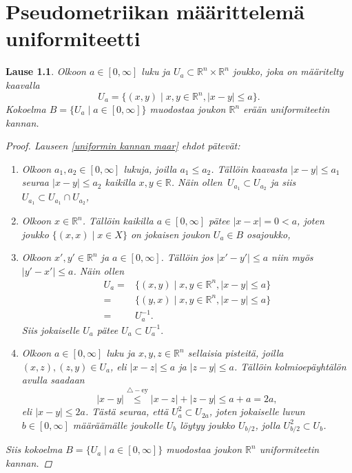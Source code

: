 \documentclass[12pt,a4paper,leqno]{report}
\newcommand{\R}{\mathbb{R}}
\theoremstyle{plain}
\newtheorem{lause}[equation]{Lause}
\theoremstyle{definition}
\theoremstyle{remark}
\begin{document}
\chapter{Pseudometriikan määrittelemä uniformiteetti}\label{luku_pseudo_uniformi}
\begin{lause}
Olkoon $a\in[0,\infty]$ luku ja $U_a\subset \R^n\times\R^n$ joukko, 
joka on määritelty kaavalla
$$U_a=\{ (x,y)\mid x,y\in\R^n,|x-y|\leq a\}.$$
Kokoelma $B=\{U_a\mid a\in[0,\infty]\}$ muodostaa 
joukon $\R^n$ erään uniformiteetin kannan.
\begin{proof}
Lauseen \ref{uniformin kannan maar} ehdot pätevät:
\begin{enumerate} [label=(B\arabic*)]
\item %
Olkoon $a_1,a_2\in[0,\infty]$ lukuja, joilla $a_1\leq a_2$. Tällöin kaavasta $|x-y|\leq a_1$ seuraa $|x-y|\leq a_2$ kaikilla $x,y\in\R$. Näin ollen $\, U_{a_1}\subset U_{a_2}$ ja siis $U_{a_1}\subset U_{a_1}\cap U_{a_2}$,
\item%
Olkoon $x\in\R^n$. Tällöin kaikilla $a\in[0,\infty]$ pätee $|x-x|=0< a$, joten joukko $\{(x,x)\mid x\in X\}$ on jokaisen joukon $U_a\in B$ osajoukko,
\item%
Olkoon $x',y'\in\R^n$ ja $a\in[0,\infty]$. Tällöin jos $|x'-y'|\leq a$ niin myös $|y'-x'|\leq a$. Näin ollen 
\begin{align*}
U_a=&\{ (x,y)\mid x,y\in\R^n,|x-y|\leq a\}\\
=&\{ (y,x)\mid x,y\in\R^n,|x-y|\leq a\}\\
=&U_a^{-1}.
\end{align*}
Siis jokaiselle $U_a$ pätee $U_a\subset  U_a^{-1}. $
\item%
Olkoon $a\in[0,\infty]$ luku ja $x,y,z\in\R^n$ sellaisia pisteitä, 
joilla $(x,z),(z,y)\in U_a$, 
eli $|x-z|\leq a$ ja $|z-y|\leq a$.
Tällöin kolmioepäyhtälön avulla saadaan 
$$|x-y|\stackrel{\triangle-\text{ey} }{\leq} |x-z|+|z-y|\leq a+a=2a,$$ 
eli $|x-y|\leq 2a$. Tästä seuraa, että $ U_a^2\subset U_{2a} $, joten jokaiselle luvun $b\in[0,\infty]$ määräämälle joukolle $U_b$ löytyy joukko $U_{b/2}$, jolla $U_{b/2}^2\subset U_b$.
\end{enumerate}
Siis kokoelma $B=\{U_a\mid a\in[0,\infty]\}$ muodostaa joukon $\R^n$ uniformiteetin kannan.
\end{proof}
\end{lause}
\end{document}
